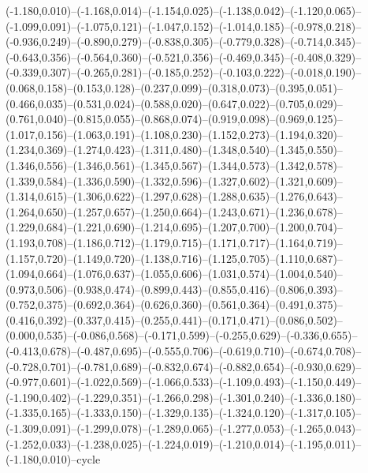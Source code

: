 \documentclass[10pt]{article}
\begin{document}
(-1.180,0.010)--(-1.168,0.014)--(-1.154,0.025)--(-1.138,0.042)--(-1.120,0.065)--(-1.099,0.091)--(-1.075,0.121)--(-1.047,0.152)--(-1.014,0.185)--(-0.978,0.218)--(-0.936,0.249)--(-0.890,0.279)--(-0.838,0.305)--(-0.779,0.328)--(-0.714,0.345)--(-0.643,0.356)--(-0.564,0.360)--(-0.521,0.356)--(-0.469,0.345)--(-0.408,0.329)--(-0.339,0.307)--(-0.265,0.281)--(-0.185,0.252)--(-0.103,0.222)--(-0.018,0.190)--(0.068,0.158)--(0.153,0.128)--(0.237,0.099)--(0.318,0.073)--(0.395,0.051)--(0.466,0.035)--(0.531,0.024)--(0.588,0.020)--(0.647,0.022)--(0.705,0.029)--(0.761,0.040)--(0.815,0.055)--(0.868,0.074)--(0.919,0.098)--(0.969,0.125)--(1.017,0.156)--(1.063,0.191)--(1.108,0.230)--(1.152,0.273)--(1.194,0.320)--(1.234,0.369)--(1.274,0.423)--(1.311,0.480)--(1.348,0.540)--(1.345,0.550)--(1.346,0.556)--(1.346,0.561)--(1.345,0.567)--(1.344,0.573)--(1.342,0.578)--(1.339,0.584)--(1.336,0.590)--(1.332,0.596)--(1.327,0.602)--(1.321,0.609)--(1.314,0.615)--(1.306,0.622)--(1.297,0.628)--(1.288,0.635)--(1.276,0.643)--(1.264,0.650)--(1.257,0.657)--(1.250,0.664)--(1.243,0.671)--(1.236,0.678)--(1.229,0.684)--(1.221,0.690)--(1.214,0.695)--(1.207,0.700)--(1.200,0.704)--(1.193,0.708)--(1.186,0.712)--(1.179,0.715)--(1.171,0.717)--(1.164,0.719)--(1.157,0.720)--(1.149,0.720)--(1.138,0.716)--(1.125,0.705)--(1.110,0.687)--(1.094,0.664)--(1.076,0.637)--(1.055,0.606)--(1.031,0.574)--(1.004,0.540)--(0.973,0.506)--(0.938,0.474)--(0.899,0.443)--(0.855,0.416)--(0.806,0.393)--(0.752,0.375)--(0.692,0.364)--(0.626,0.360)--(0.561,0.364)--(0.491,0.375)--(0.416,0.392)--(0.337,0.415)--(0.255,0.441)--(0.171,0.471)--(0.086,0.502)--(0.000,0.535)--(-0.086,0.568)--(-0.171,0.599)--(-0.255,0.629)--(-0.336,0.655)--(-0.413,0.678)--(-0.487,0.695)--(-0.555,0.706)--(-0.619,0.710)--(-0.674,0.708)--(-0.728,0.701)--(-0.781,0.689)--(-0.832,0.674)--(-0.882,0.654)--(-0.930,0.629)--(-0.977,0.601)--(-1.022,0.569)--(-1.066,0.533)--(-1.109,0.493)--(-1.150,0.449)--(-1.190,0.402)--(-1.229,0.351)--(-1.266,0.298)--(-1.301,0.240)--(-1.336,0.180)--(-1.335,0.165)--(-1.333,0.150)--(-1.329,0.135)--(-1.324,0.120)--(-1.317,0.105)--(-1.309,0.091)--(-1.299,0.078)--(-1.289,0.065)--(-1.277,0.053)--(-1.265,0.043)--(-1.252,0.033)--(-1.238,0.025)--(-1.224,0.019)--(-1.210,0.014)--(-1.195,0.011)--(-1.180,0.010)--cycle 
\end{document}
